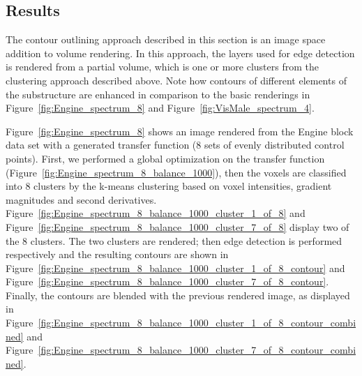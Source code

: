 \subsection{Results}
The contour outlining approach described in this section is an image space addition to volume rendering. In this approach, the layers used for edge detection is rendered from a partial volume, which is one or more clusters from the clustering approach described above. Note how contours of different elements of the substructure are enhanced in comparison to the basic renderings in Figure~\ref{fig:Engine_spectrum_8} and Figure~\ref{fig:VisMale_spectrum_4}.

Figure~\ref{fig:Engine_spectrum_8} shows an image rendered from the Engine block data set with a generated transfer function (8 sets of evenly distributed control points). First, we performed a global optimization on the transfer function (Figure~\ref{fig:Engine_spectrum_8_balance_1000}), then the voxels are classified into 8 clusters by the k-means clustering based on voxel intensities, gradient magnitudes and second derivatives. Figure~\ref{fig:Engine_spectrum_8_balance_1000_cluster_1_of_8} and Figure~\ref{fig:Engine_spectrum_8_balance_1000_cluster_7_of_8} display two of the 8 clusters. The two clusters are rendered; then edge detection is performed respectively and the resulting contours are shown in Figure~\ref{fig:Engine_spectrum_8_balance_1000_cluster_1_of_8_contour} and Figure~\ref{fig:Engine_spectrum_8_balance_1000_cluster_7_of_8_contour}. Finally, the contours are blended with the previous rendered image, as displayed in Figure~\ref{fig:Engine_spectrum_8_balance_1000_cluster_1_of_8_contour_combined} and Figure~\ref{fig:Engine_spectrum_8_balance_1000_cluster_7_of_8_contour_combined}.



